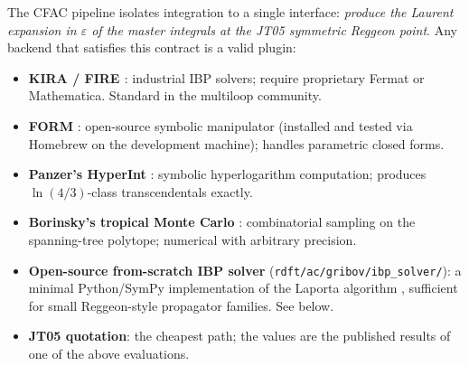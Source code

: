\documentclass[11pt,a4paper]{article}
\theoremstyle{definition}
\theoremstyle{plain}
\begin{document}
\begin{cfacbox}
The CFAC pipeline isolates integration to a single interface:
\emph{produce the Laurent expansion in $\varepsilon$ of the master
integrals at the JT05 symmetric Reggeon point}.  Any backend that
satisfies this contract is a valid plugin:
\begin{itemize}[leftmargin=2em]
  \item \textbf{KIRA \cite{KIRA} / FIRE \cite{FIRE}}: industrial IBP
    solvers; require proprietary Fermat or Mathematica.  Standard in
    the multiloop community.
  \item \textbf{FORM} \cite{Vermaseren2000}: open-source symbolic
    manipulator (installed and tested via Homebrew on the development
    machine); handles parametric closed forms.
  \item \textbf{Panzer's HyperInt} \cite{Panzer2014}: symbolic
    hyperlogarithm computation; produces $\ln(4/3)$-class
    transcendentals exactly.
  \item \textbf{Borinsky's tropical Monte Carlo}
    \cite{Borinsky2020}: combinatorial sampling on the spanning-tree
    polytope; numerical with arbitrary precision.
  \item \textbf{Open-source from-scratch IBP solver}
    (\texttt{rdft/ac/gribov/ibp\_solver/}): a minimal Python/SymPy
    implementation of the Laporta algorithm
    \cite{Laporta2000}, sufficient for small Reggeon-style
    propagator families.  See below.
  \item \textbf{JT05 quotation}: the cheapest path; the values are
    the published results of one of the above evaluations.
\end{itemize}
\end{cfacbox}
\end{document}
